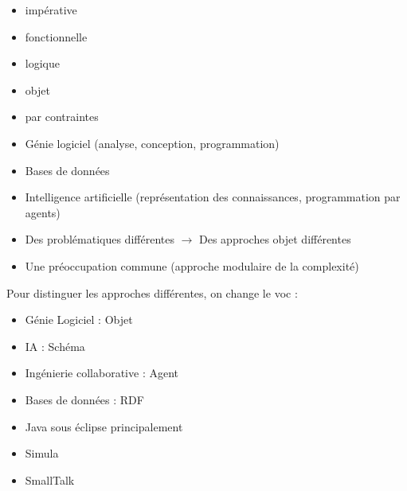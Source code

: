 \begin{itemize}
	\item impérative
	\item fonctionnelle
	\item logique
	\item objet
	\item par contraintes
\end{itemize}

\newpage

\begin{itemize}
	\item Génie logiciel (analyse, conception, programmation)
	\item Bases de données
	\item Intelligence artificielle (représentation des connaissances, programmation par agents)
\end{itemize}

\begin{itemize}
	\item Des problématiques différentes $\rightarrow$ Des approches objet différentes
	\item Une préoccupation commune (approche modulaire de la complexité)
\end{itemize}
Pour distinguer les approches différentes, on change le voc :
\begin{itemize}
	\item Génie Logiciel : Objet
	\item IA : Schéma
	\item Ingénierie collaborative : Agent
	\item Bases de données : RDF
\end{itemize}

\begin{itemize}
	\item Java sous éclipse principalement
	\item Simula
	\item SmallTalk
\end{itemize}
